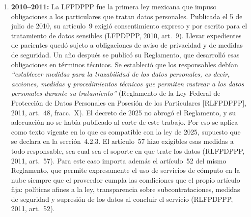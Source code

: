 \documentclass[12pt, a4paper]{article}
\begin{document}
\begin{enumerate}[label=\Roman*.]
  \item \textbf{2010--2011:} La LFPDPPP fue la primera ley mexicana
  que impuso obligaciones a los particulares que tratan datos
  personales. Publicada el 5 de julio de 2010, su artículo~9 exigió
  consentimiento expreso y por escrito para el tratamiento de datos
  sensibles (LFPDPPP, 2010, art.~9). Llevar expedientes de pacientes
  quedó sujeto a obligaciones de aviso de privacidad y de medidas de
  seguridad. Un año después se publicó su Reglamento, que desarrolló
  esas obligaciones en términos técnicos. Se estableció que los
  responsables debían \textit{``establecer medidas para la trazabilidad de los datos personales, es decir, acciones, medidas y procedimientos técnicos
  que permiten rastrear a los datos personales durante su tratamiento''}
  (Reglamento de la Ley Federal de Protección de Datos Personales en
  Posesión de los Particulares [RLFPDPPP], 2011, art.~48, fracc.~X). El
  decreto de 2025 no abrogó el Reglamento, y su adecuación no se había
  publicado al corte de este trabajo. Por eso se aplica como texto vigente
  en lo que es compatible con la ley de 2025, supuesto que se declara en
  la sección~4.2.3. El artículo~57 hizo exigibles esas medidas a todo
responsable, sea cual sea el soporte en que trate los datos
(RLFPDPPP, 2011, art.~57). Para este caso importa además el
  artículo~52 del mismo Reglamento, que permite expresamente el uso
  de servicios de cómputo en la nube siempre que el proveedor cumpla
  las condiciones que el propio artículo fija: políticas afines a la
  ley, transparencia sobre subcontrataciones, medidas de seguridad y
  supresión de los datos al concluir el servicio (RLFPDPPP, 2011,
  art.~52).
 

\end{enumerate}
\end{document}
